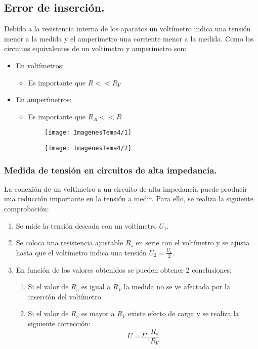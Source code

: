 \subsection{Error de inserción.}
Debido a la resistencia interna de los aparatos un voltímetro indica una tensión menor a la medida y el amperímetro una corriente menor a la medida. Como los circuitos equivalentes de un voltímetro y amperímetro son:

\begin{itemize}
	\item En voltímetros:
	\begin{itemize}
		\item Es importante que $R << R_V$
	\end{itemize}
	\item En amperímetros:
	\begin{itemize}
		\item Es importante que $R_A << R$
	\end{itemize}
\end{itemize}


\begin{figure}[H]
	\begin{minipage}{0.5\textwidth}
		\begin{figure}[H]
			\centering
			\texttt{[image: ImagenesTema4/1]}
			\label{fig:1}
		\end{figure}
	\end{minipage}
	\begin{minipage}{0.5\textwidth}
		\begin{figure}[H]
			\centering
			\texttt{[image: ImagenesTema4/2]}
			\label{fig:2}
		\end{figure}
	\end{minipage}
\end{figure}

\subsubsection{Medida de tensión en circuitos de alta impedancia.}
La conexión de un voltímetro a un circuito de alta impedancia puede producir una reducción importante en la tensión a medir. Para ello, se realiza la siguiente comprobación:

\begin{enumerate}
	\item Se mide la tensión deseada con un voltímetro $U_1$.
	\item Se coloca una resistencia ajustable $R_s$ en serie con el voltímetro y se ajusta hasta que el voltímetro indica una tensión $U_2=\frac{U_1}{2}$.
	\item En función de los valores obtenidos se pueden obtener 2 conclusiones:
	\begin{enumerate}
		\item Si el valor de $R_s$ es igual a $R_V$ la medida no se ve afectada por la inserción del voltímetro.
		\item Si el valor de $R_s$ es mayor a $R_V$ existe efecto de carga y se realiza la siguiente corrección:
		\[U=U_1\frac{R_s}{R_V}\]   
	\end{enumerate}
\end{enumerate}


